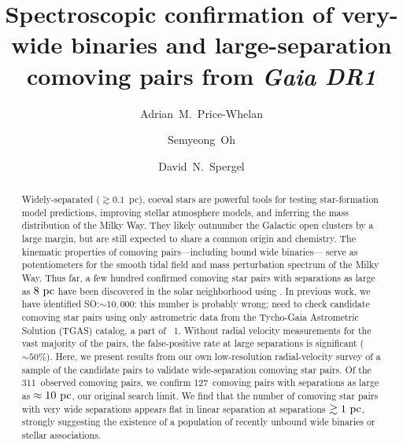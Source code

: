 \documentclass[modern, letterpaper]{aastex61}
\newcommand{\gaia}{\project{Gaia}}
\newcommand{\DR}[1]{\acronym{DR}#1}
\newcommand{\npairsobs}{311}
\newcommand{\ncomoving}{127}
\newcommand{\smoh}[1]{\textcolor{mediumpersianblue}{SO:#1}}
\begin{document}
\sloppy\sloppypar\raggedbottom\frenchspacing %

\title{Spectroscopic confirmation of very-wide binaries and large-separation
       comoving pairs from \textsl{Gaia DR1}}

\author{Adrian~M.~Price-Whelan}

\author{Semyeong~Oh}

\author{David~N.~Spergel}




\begin{abstract}
Widely-separated ($\gtrsim 0.1$~pc), coeval stars are powerful tools for
testing star-formation model predictions, improving stellar atmosphere models,
and inferring the mass distribution of the Milky Way.
They likely outnumber the Galactic open clusters by a large margin, but are
still expected to share a common origin and chemistry.
The kinematic properties of comoving pairs---including bound wide binaries---
serve as potentiometers for the smooth tidal field and mass perturbation
spectrum of the Milky Way.
Thus far, a few hundred confirmed comoving star pairs with separations as large
as $8~\mathrm{pc}$ have been discovered in the solar neighborhood using
.
In previous work, we have identified \smoh{$\sim 10,000$: this number is probably wrong; need to check} candidate comoving star pairs
using only astrometric data from the Tycho-Gaia Astrometric Solution (TGAS)
catalog, a part of \gaia\ \DR{1}.
Without radial velocity measurements for the vast majority of the pairs, the
false-positive rate at large separations is significant ($\sim 50\%$).
Here, we present results from our own low-resolution radial-velocity survey of a
sample of the candidate pairs to validate wide-separation comoving star pairs.
Of the \npairsobs\ observed comoving pairs, we confirm \ncomoving\ comoving
pairs with separations as large as $\approx 10~\mathrm{pc}$, our original search limit.
We find that the number of comoving star pairs with very wide separations
appears flat in linear separation at separations $\gtrsim 1~\mathrm{pc}$, strongly
suggesting the existence of a population of recently unbound wide binaries or
stellar associations.
\end{abstract}
\end{document}
